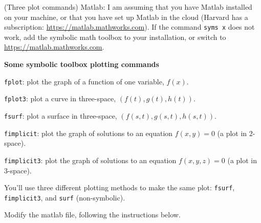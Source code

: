 \documentclass[12pt,letterpaper]{exam}
\begin{document}
\begin{questions}
\item (Three plot commands) Matlab: I am assuming that you have Matlab installed on your machine, or that you have set up Matlab in the cloud (Harvard has a subscription: \url{https://matlab.mathworks.com}).  If the command \texttt{syms x} does not work, add the symbolic math toolbox to your installation, or switch to \url{https://matlab.mathworks.com}.

\begin{tcolorbox}
\noindent\textbf{Some symbolic toolbox plotting commands}

\texttt{fplot}: plot the graph of a function of one variable, $f(x)$.

\texttt{fplot3}: plot a curve in three-space, $\left(f(t),g(t),h(t)\right)$.

\texttt{fsurf}: plot a surface in three-space, $\left(f(s,t),g(s,t),h(s,t)\right)$.

\texttt{fimplicit}: plot the graph of solutions to an equation $f(x,y) = 0$ (a plot in $2$-space).

\texttt{fimplicit3}: plot the graph of solutions to an equation $f(x,y,z) = 0$ (a plot in $3$-space).
\end{tcolorbox}

You'll use three different plotting methods to make the same plot: \texttt{fsurf}, \texttt{fimplicit3}, and \texttt{surf} (non-symbolic).
\begin{parts}
\item Modify the matlab file, following the instructions below.


\end{parts}
\end{questions}
\end{document}
